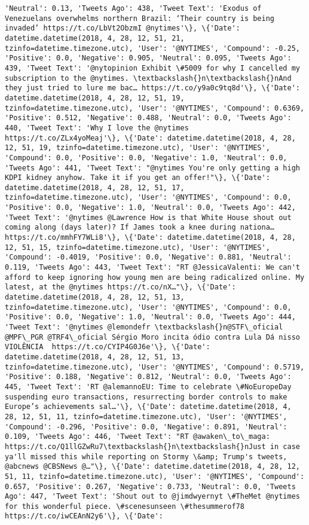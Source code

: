 \documentclass[11pt]{article}
\begin{document}
\begin{Verbatim}[commandchars=\\\{\}]
'Neutral': 0.13, 'Tweets Ago': 438, 'Tweet Text': 'Exodus of Venezuelans overwhelms northern Brazil: ‘Their country is being invaded’ https://t.co/LbVt2ObzmI @nytimes'\}, \{'Date': datetime.datetime(2018, 4, 28, 12, 51, 21, tzinfo=datetime.timezone.utc), 'User': '@NYTIMES', 'Compound': -0.25, 'Positive': 0.0, 'Negative': 0.905, 'Neutral': 0.095, 'Tweets Ago': 439, 'Tweet Text': '@nytopinion Exhibit \#5009 for why I cancelled my subscription to the @nytimes. \textbackslash{}n\textbackslash{}nAnd they just tried to lure me bac… https://t.co/y9a0c9tq8d'\}, \{'Date': datetime.datetime(2018, 4, 28, 12, 51, 19, tzinfo=datetime.timezone.utc), 'User': '@NYTIMES', 'Compound': 0.6369, 'Positive': 0.512, 'Negative': 0.488, 'Neutral': 0.0, 'Tweets Ago': 440, 'Tweet Text': 'Why I love the @nytimes https://t.co/ZLx4yoMeaj'\}, \{'Date': datetime.datetime(2018, 4, 28, 12, 51, 19, tzinfo=datetime.timezone.utc), 'User': '@NYTIMES', 'Compound': 0.0, 'Positive': 0.0, 'Negative': 1.0, 'Neutral': 0.0, 'Tweets Ago': 441, 'Tweet Text': "@nytimes You're only getting a high KDPI kidney anyhow. Take it if you get an offer!"\}, \{'Date': datetime.datetime(2018, 4, 28, 12, 51, 17, tzinfo=datetime.timezone.utc), 'User': '@NYTIMES', 'Compound': 0.0, 'Positive': 0.0, 'Negative': 1.0, 'Neutral': 0.0, 'Tweets Ago': 442, 'Tweet Text': '@nytimes @Lawrence How is that White House shout out coming along (days later)? If James took a knee during nationa… https://t.co/mmhFY7WLi8'\}, \{'Date': datetime.datetime(2018, 4, 28, 12, 51, 15, tzinfo=datetime.timezone.utc), 'User': '@NYTIMES', 'Compound': -0.4019, 'Positive': 0.0, 'Negative': 0.881, 'Neutral': 0.119, 'Tweets Ago': 443, 'Tweet Text': "RT @JessicaValenti: We can't afford to keep ignoring how young men are being radicalized online. My latest, at the @nytimes https://t.co/nX…"\}, \{'Date': datetime.datetime(2018, 4, 28, 12, 51, 13, tzinfo=datetime.timezone.utc), 'User': '@NYTIMES', 'Compound': 0.0, 'Positive': 0.0, 'Negative': 1.0, 'Neutral': 0.0, 'Tweets Ago': 444, 'Tweet Text': '@nytimes @lemondefr \textbackslash{}n@STF\_oficial @MPF\_PGR @TRF4\_oficial Sérgio Moro incita ódio contra Lula Dá nisso VIOLÊNCIA  https://t.co/CYIP4G0J6e'\}, \{'Date': datetime.datetime(2018, 4, 28, 12, 51, 13, tzinfo=datetime.timezone.utc), 'User': '@NYTIMES', 'Compound': 0.5719, 'Positive': 0.188, 'Negative': 0.812, 'Neutral': 0.0, 'Tweets Ago': 445, 'Tweet Text': 'RT @alemannoEU: Time to celebrate \#NoEuropeDay suspending euro transactions, resurrecting border controls to make Europe’s achievements sal…'\}, \{'Date': datetime.datetime(2018, 4, 28, 12, 51, 11, tzinfo=datetime.timezone.utc), 'User': '@NYTIMES', 'Compound': -0.296, 'Positive': 0.0, 'Negative': 0.891, 'Neutral': 0.109, 'Tweets Ago': 446, 'Tweet Text': "RT @awaken\_to\_maga: https://t.co/Q1llGZwRu7\textbackslash{}n\textbackslash{}nJust in case ya'll missed this while reporting on Stormy \&amp; Trump's tweets, @abcnews @CBSNews @…"\}, \{'Date': datetime.datetime(2018, 4, 28, 12, 51, 11, tzinfo=datetime.timezone.utc), 'User': '@NYTIMES', 'Compound': 0.657, 'Positive': 0.267, 'Negative': 0.733, 'Neutral': 0.0, 'Tweets Ago': 447, 'Tweet Text': 'Shout out to @jimdwyernyt \#TheMet @nytimes for this wonderful piece. \#scenesunseen \#thesummerof78 https://t.co/iwCEAnN2y6'\}, \{'Date': 
\end{Verbatim}
\end{document}
